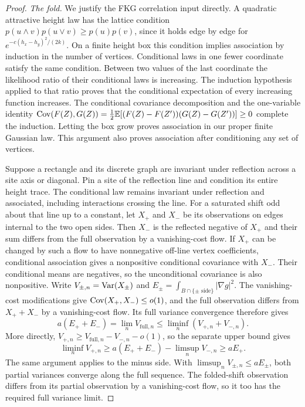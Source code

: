 \begin{proof}
\emph{The fold.}
We justify the FKG correlation input \citep{FKG1971} directly.
A quadratic attractive height
law has the lattice condition
$p(u\wedge v)p(u\vee v)\ge p(u)p(v)$, since it holds edge by edge for
$e^{-c(h_x-h_y)^2/(2k)}$. On a finite height box this condition implies
association by induction in the number of vertices. Conditional laws in
one fewer coordinate satisfy the same condition. Between two values of
the last coordinate the likelihood ratio of their conditional laws is
increasing. The induction hypothesis applied to that ratio proves that
the conditional expectation of every increasing function increases.
The conditional covariance decomposition and the one-variable identity
$\operatorname{Cov}(F(Z),G(Z))=\frac12\mathbb E[(F(Z)-F(Z'))(G(Z)-G(Z'))]\ge0$
complete the induction. Letting the box grow proves association in our
proper finite Gaussian law. This argument also proves association after
conditioning any set of vertices.

Suppose a rectangle and its discrete graph are invariant under reflection
across a site axis or diagonal. Pin a site of the reflection line and
condition its entire height trace. The conditional law remains invariant
under reflection and associated, including interactions crossing the line.
For a saturated shift odd about that line up to a constant, let $X_+$ and
$X_-$ be its observations on edges internal to the two open sides. Then
$X_-$ is the reflected negative of $X_+$ and their sum differs from the
full observation by a vanishing-cost flow. If $X_+$ can be changed by such
a flow to have nonnegative off-line vertex coefficients, conditional
association gives a nonpositive conditional covariance with $X_-$.
Their conditional means are negatives, so the unconditional covariance
is also nonpositive. Write $V_{\pm,n}=\operatorname{Var}(X_\pm)$ and
$E_\pm=\int_{B\cap\{\pm\text{ side}\}}|\nabla g|^2$.
The vanishing-cost modifications give
$\operatorname{Cov}(X_+,X_-)\le o(1)$, and the full observation differs from
$X_++X_-$ by a vanishing-cost flow. Its full variance convergence
therefore gives
\[
 a(E_++E_-)
 =\lim_n V_{\mathrm{full},n}
 \le\liminf_n(V_{+,n}+V_{-,n}).
\]
More directly, $V_{+,n}\ge V_{\mathrm{full},n}-V_{-,n}-o(1)$,
so the separate upper bound gives
\[
 \liminf_nV_{+,n}
 \ge a(E_++E_-)-\limsup_nV_{-,n}\ge aE_+.
\]
The same argument applies to the minus side. With
$\limsup_nV_{\pm,n}\le aE_\pm$, both partial variances converge
along the full sequence. The folded-shift observation differs from its
partial observation by a vanishing-cost flow, so it too has the required
full variance limit.


\end{proof}
